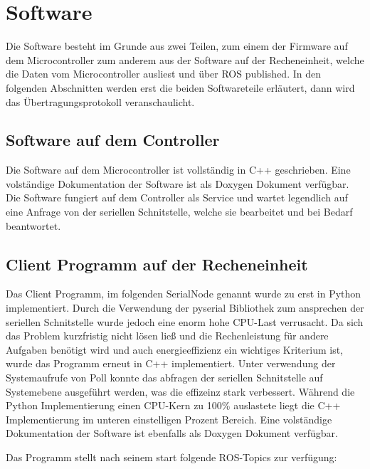\section{Software}

Die Software besteht im Grunde aus zwei Teilen, zum einem der Firmware auf dem Microcontroller zum anderem aus der Software auf der Recheneinheit, welche die Daten vom Microcontroller ausliest und über ROS published.
In den folgenden Abschnitten werden erst die beiden Softwareteile erläutert, dann wird das Übertragungsprotokoll veranschaulicht.


\subsection{Software auf dem \textmu Controller}
Die Software auf dem Microcontroller ist vollständig in C++ geschrieben. Eine volständige Dokumentation der Software ist als Doxygen Dokument verfügbar. 
Die Software fungiert auf dem Controller als Service und wartet legendlich auf eine Anfrage von der seriellen Schnitstelle, welche sie bearbeitet und bei Bedarf beantwortet. 


\subsection{Client Programm auf der Recheneinheit}
Das Client Programm, im folgenden SerialNode genannt wurde zu erst in Python implementiert. Durch die Verwendung der pyserial Bibliothek zum ansprechen der seriellen Schnitstelle wurde jedoch
eine enorm hohe CPU-Last verrusacht. Da sich das Problem kurzfristig nicht lösen ließ und die Rechenleistung für andere Aufgaben benötigt wird und auch energieeffizienz ein wichtiges Kriterium ist,
wurde das Programm erneut in C++ implementiert. Unter verwendung der Systemaufrufe von Poll konnte das abfragen der seriellen Schnitstelle auf Systemebene ausgeführt werden, was die effizeinz stark 
verbessert. Während die Python Implementierung einen CPU-Kern zu 100\% auslastete liegt die C++ Implementierung im unteren einstelligen Prozent Bereich.
Eine volständige Dokumentation der Software ist ebenfalls als Doxygen Dokument verfügbar.

Das Programm stellt nach seinem start folgende ROS-Topics zur verfügung:\\
 
